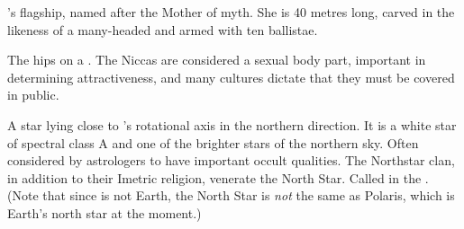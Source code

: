 \begin{gloss}
  
  
  \begin{comment}
  \paragraph{\MotherTiamat}
  \end{comment}
  \gitem{\MotherTiamat}
  \Narkiza's flagship, named after the \Dragon{} Mother of myth. She is 40 metres long, carved in the likeness of a many-headed \dragon{} and armed with ten ballistae. 
  
  
  
  \begin{comment}
  \paragraph{nicca}
  \end{comment}
  The hips on a \scatha{}. The Niccas are considered a sexual body part, important in determining attractiveness, and many cultures dictate that they must be covered in public. 
  
  
  
  \begin{comment}
  \paragraph{North Star}
  \end{comment}
  A star lying close to \Miith{}'s rotational axis in the northern direction. 
  It is a white star of spectral class A and one of the brighter stars of the northern sky. Often considered by astrologers to have important occult qualities. 
  The Northstar clan, in addition to their Imetric religion, venerate the North Star. 
  Called  in the . 
  (Note that since \Miith{} is not Earth, the North Star is \emph{not} the same as Polaris, which is Earth's north star at the moment.)
  
  
  
  \begin{comment}
  \subsubsection{O-U}
  \end{comment}
  
  
  
  
  

\end{gloss}

